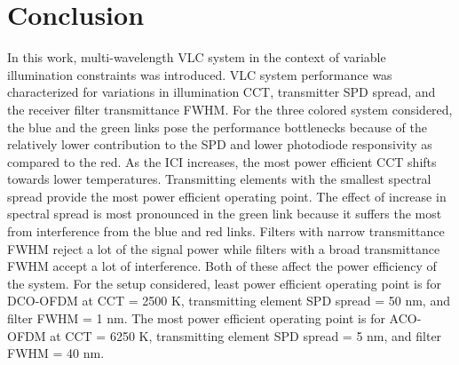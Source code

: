 \section{Conclusion}\label{sec:conclusion}
In this work, multi-wavelength VLC system in the context of variable illumination constraints was introduced. VLC system performance was characterized for variations in illumination CCT, transmitter SPD spread, and the receiver filter transmittance FWHM. For the three colored system considered, the blue and the green links pose the performance bottlenecks because of the relatively lower contribution to the SPD and lower photodiode responsivity as compared to the red. As the ICI increases, the most power efficient CCT shifts towards lower temperatures. Transmitting elements with the smallest spectral spread provide the most power efficient operating point. The effect of increase in spectral spread is most pronounced in the green link because it suffers the most from interference from the blue and red links. Filters with narrow transmittance FWHM reject a lot of the signal power while filters with a broad transmittance FWHM accept a lot of interference. Both of these affect the power efficiency of the system. For the setup considered, least power efficient operating point is for DCO-OFDM at CCT = 2500 K, transmitting element SPD spread = 50 nm, and filter FWHM = 1 nm. The most power efficient operating point is for ACO-OFDM at CCT = 6250 K, transmitting element SPD spread = 5 nm, and filter FWHM = 40 nm.
